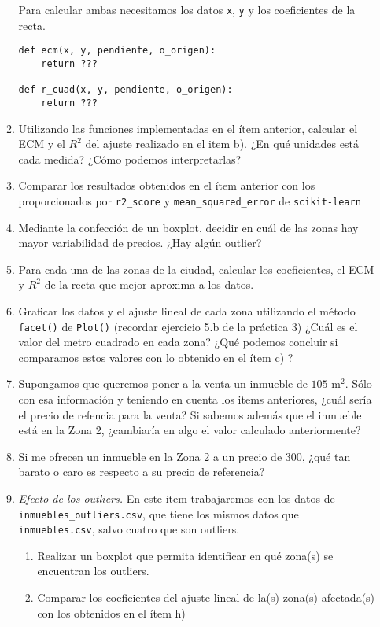 \documentclass[a4paper,11pt]{article}
\theoremstyle{definition}
\begin{document}
\begin{enumerate}[resume]
\begin{enumerate}
    Para calcular ambas necesitamos los datos \texttt{x}, \texttt{y} y los coeficientes de la recta.

\begin{lstlisting}
def ecm(x, y, pendiente, o_origen):      
    return ???

def r_cuad(x, y, pendiente, o_origen):
    return ???
\end{lstlisting}

    \item Utilizando las funciones implementadas en el ítem anterior, calcular el ECM y el $R^2$ del ajuste realizado en el item b). ¿En qué unidades está cada medida? ¿Cómo podemos interpretarlas?

    \item Comparar los resultados obtenidos en el ítem anterior con los proporcionados por \texttt{r2\_score} y \texttt{mean\_squared\_error} de \texttt{scikit-learn}

    \item Mediante la confección de un boxplot, decidir en cuál de las zonas hay mayor variabilidad de precios. ¿Hay algún outlier?

    \item Para cada una de las zonas de la ciudad, calcular los coeficientes, el ECM y $R^2$ de la recta que mejor aproxima a los datos.
    
    \item Graficar los datos y el ajuste lineal de cada zona utilizando el método \lstinline{facet()} de \lstinline{Plot()} (recordar ejercicio 5.b de la práctica 3) ¿Cuál es el valor del metro cuadrado en cada zona? ¿Qué podemos concluir si comparamos estos valores con lo obtenido en el ítem c) ?

    \item Supongamos que queremos poner a la venta un inmueble de $105$ m$^2$. Sólo con esa información y teniendo en cuenta los items anteriores, ¿cuál sería el precio de refencia para la venta? Si sabemos además que el inmueble está en la Zona 2, ¿cambiaría en algo el valor calculado anteriormente? 

    \item Si me ofrecen un inmueble en la Zona 2 a un precio de 300, ¿qué tan barato o caro es respecto a su precio de referencia?

    \item \textit{Efecto de los outliers.} En este item trabajaremos con los datos de \texttt{inmuebles\_outliers.csv}, que tiene los mismos datos que \texttt{inmuebles.csv}, salvo cuatro que son outliers.
    \begin{enumerate}
        \item Realizar un boxplot que permita identificar en qué zona(s) se encuentran los outliers.
        \item Comparar los coeficientes del ajuste lineal de la(s) zona(s) afectada(s) con los obtenidos en el ítem h)
    \end{enumerate}
    


\end{enumerate}
\end{enumerate}
\end{document}
